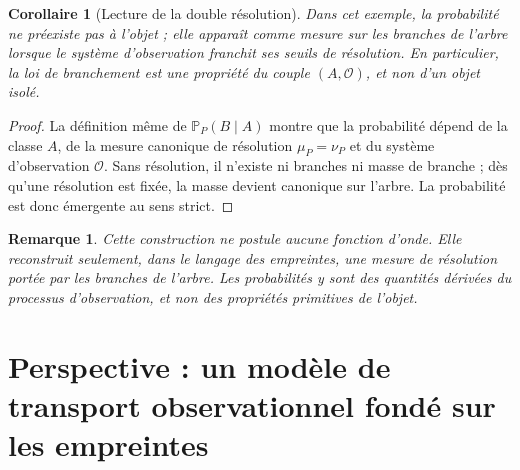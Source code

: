 \documentclass[11pt,a4paper]{article}
\newtheorem{corollary}{Corollaire}
\newtheorem{remark}{Remarque}
\begin{document}
\begin{appendices}
\begin{corollary}[Lecture de la double résolution]
Dans cet exemple, la probabilité ne préexiste pas à l'objet ; elle apparaît comme mesure sur les branches de l'arbre lorsque le système d'observation franchit ses seuils de résolution. En particulier, la loi de branchement est une propriété du couple \((A,\mathcal O)\), et non d'un objet isolé.
\end{corollary}

\begin{proof}
La définition même de \(\mathbb P_P(B\mid A)\) montre que la probabilité dépend de la classe \(A\), de la mesure canonique de résolution \(\mu_P=\nu_P\) et du système d'observation \(\mathcal O\). Sans résolution, il n'existe ni branches ni masse de branche ; dès qu'une résolution est fixée, la masse devient canonique sur l'arbre. La probabilité est donc émergente au sens strict.
\end{proof}

\begin{remark}
Cette construction ne postule aucune fonction d'onde. Elle reconstruit seulement, dans le langage des empreintes, une mesure de résolution portée par les branches de l'arbre. Les probabilités y sont des quantités dérivées du processus d'observation, et non des propriétés primitives de l'objet.
\end{remark}











\section{Perspective : un modèle de transport observationnel fondé sur les empreintes}


\end{appendices}
\end{document}
